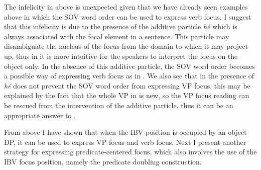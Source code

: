 \documentclass[output=paper,colorlinks,citecolor=brown,
]{langscibook}
\begin{document}
The infelicity in  above is unexpected given that we have already seen examples above in which the SOV word order can be used to express verb focus. I suggest that this infelicity is due to the presence of the additive particle \textit{hé} which is always associated with the focal element in a sentence. This particle may disambiguate the nucleus of the focus from the domain to which it may project up, thus in  it is more intuitive for the speakers to interpret the focus on the object only. In the absence of this additive particle, the SOV word order becomes a possible way of expressing verb focus as in . We also see that in  the presence of \textit{hé} does not prevent the SOV word order from expressing VP focus, this may be explained by the fact that the whole VP in  is new, so the VP focus reading can be rescued from the intervention of the additive particle, thus it can be an appropriate answer to .

From above I have shown that when the IBV position is occupied by an object DP, it can be used to express VP focus and verb focus. Next I present another strategy for expressing predicate-centered focus, which also involves the use of the IBV focus position, namely the predicate doubling construction.
\end{document}
